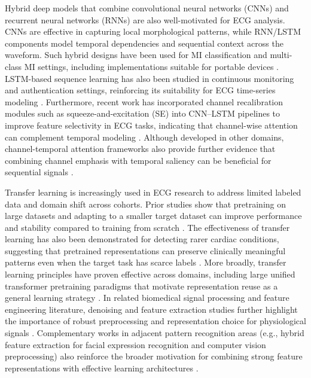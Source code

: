 \documentclass[preprint,12pt]{elsarticle}
\begin{document}
Hybrid deep models that combine convolutional neural networks (CNNs) and recurrent neural networks (RNNs) are also well-motivated for ECG analysis. CNNs are effective in capturing local morphological patterns, while RNN/LSTM components model temporal dependencies and sequential context across the waveform. Such hybrid designs have been used for MI classification and multi-class MI settings, including implementations suitable for portable devices \cite{FengPiLiuSun2019ApplSci_MI_CNN_RNN,LuiChow2019IMU_MI_CNN_RNN_Portable,Hasbullah2023BioMedInformatics_MI_Hybrid_CNN_RNN}. LSTM-based sequence learning has also been studied in continuous monitoring and authentication settings, reinforcing its suitability for ECG time-series modeling \cite{SaadatnejadOveisiHashemi2020JBHI_LSTM_Wearable,KimPyun2020Sensors_ECG_Auth_LSTM}. Furthermore, recent work has incorporated channel recalibration modules such as squeeze-and-excitation (SE) into CNN--LSTM pipelines to improve feature selectivity in ECG tasks, indicating that channel-wise attention can complement temporal modeling \cite{Sun2024Sensors_CNNLSTMSE,QuFu2025JSMU_ResLSTM_TemporalSE}. Although developed in other domains, channel-temporal attention frameworks also provide further evidence that combining channel emphasis with temporal saliency can be beneficial for sequential signals \cite{LimKim2025ApplSci_SpikeCAN}.

Transfer learning is increasingly used in ECG research to address limited labeled data and domain shift across cohorts. Prior studies show that pretraining on large datasets and adapting to a smaller target dataset can improve performance and stability compared to training from scratch \cite{WeimannConrad2021SciRep_TL_ECG,JangKimYoon2021HIR_TL_ECG,ChuiGuptaZhaoMalibariAryaAlhalabiRuiz2022Bioengineering_DistantTL_ECG}. The effectiveness of transfer learning has also been demonstrated for detecting rarer cardiac conditions, suggesting that pretrained representations can preserve clinically meaningful patterns even when the target task has scarce labels \cite{LopesBleijendaalRamosVerstraelenAminWildePintoDeMolMarquering2021CBM_TL_PLN}. More broadly, transfer learning principles have proven effective across domains, including large unified transformer pretraining paradigms that motivate representation reuse as a general learning strategy \cite{RaffelShazeerRobertsLeeNarangMatenaZhouLiLiu2020JMLR_T5}. In related biomedical signal processing and feature engineering literature, denoising and feature extraction studies further highlight the importance of robust preprocessing and representation choice for physiological signals \cite{ParsaoranMandalaPramudyo2022ICoDSA_PPG_Denoising,IhsanMandalaPramudyo2022ICoDSA_PPG_CHD,MandalaFuadahArzakiPambudi2017ICoICT_ECG_Denoising,MandalaTresnasariLestari2022ICICyTA_ECG_Daubechies}. Complementary works in adjacent pattern recognition areas (e.g., hybrid feature extraction for facial expression recognition and computer vision preprocessing) also reinforce the broader motivation for combining strong feature representations with effective learning architectures \cite{KommineniMandalaSunarChakravarthy2021JSC_FER_Hybrid,KommineniMandala2014ICACCI_CBirPreprocess,MandalaRamadhanIrsan2023COMNETSAT_SmartHome_CNN}.
\end{document}

